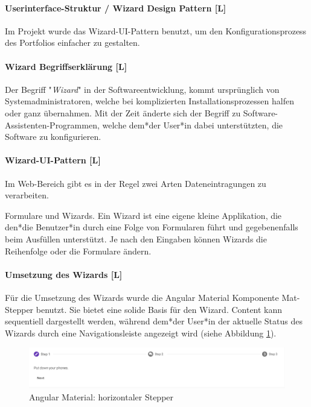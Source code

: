 \paragraph{Userinterface-Struktur / Wizard Design Pattern [L]}
\label{sec::contentcreation::wizard}
Im Projekt wurde das Wizard-UI-Pattern benutzt, um den Konfigurationsprozess des Portfolios einfacher zu gestalten.

\paragraph*{Wizard Begriffserklärung [L]}
Der Begriff "\emph{Wizard}" in der Softwareentwicklung, kommt ursprünglich von Systemadministratoren, welche bei komplizierten Installationsprozessen halfen oder ganz übernahmen. Mit der Zeit änderte sich der Begriff zu Software-Assistenten-Programmen, welche dem*der User*in dabei unterstützten, die Software zu konfigurieren. \cite[Ursprung des Begriffs Wizard]{OrigionOfWizards}

\paragraph{Wizard-UI-Pattern [L]}
Im Web-Bereich gibt es in der Regel zwei Arten Dateneintragungen zu verarbeiten.

Formulare und Wizards. Ein Wizard ist eine eigene kleine Applikation, die den*die Benutzer*in durch eine Folge von Formularen führt und gegebenenfalls beim Ausfüllen unterstützt. Je nach den Eingaben können Wizards die Reihenfolge oder die Formulare ändern.\cite[Wizards: Definition and Design Recommendations]{WizradsDefinitionAndRecommandation}

\paragraph{Umsetzung des Wizards [L]}
Für die Umsetzung des Wizards wurde die Angular Material Komponente Mat-Stepper benutzt. Sie bietet eine solide Basis für den Wizard. Content kann sequentiell dargestellt werden, während dem*der User*in der aktuelle Status des Wizards durch eine Navigationsleiste angezeigt wird (siehe Abbildung \ref{fig:impl:creation:mathorziontalstepper}). \cite{amStepper}

\begin{figure}
    \centering
    \includegraphics[scale=0.5]{pics/mathorziontalstepper.png}
    \caption{Angular Material: horizontaler Stepper \cite{amStepper}}
    \label{fig:impl:creation:mathorziontalstepper}
\end{figure}

